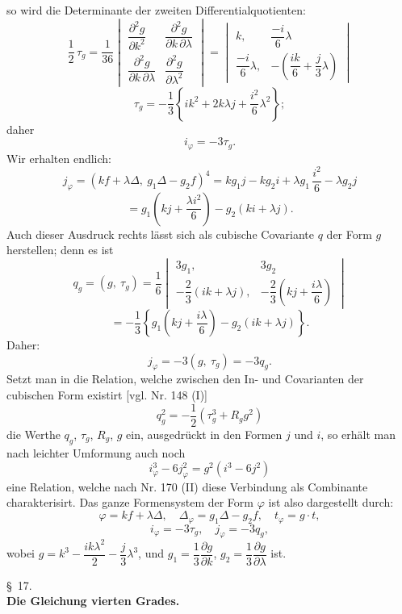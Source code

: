 \documentclass[11pt]{article}
\providecommand{\weberpage}[1]{}
\begin{document}
\weberpage{190}
so wird die Determinante der zweiten Differentialquotienten:
\[
\frac{1}{2}\,\tau_g = \frac{1}{36}
\begin{vmatrix}
\dfrac{\partial^2 g}{\partial k^2} & \dfrac{\partial^2 g}{\partial k\,\partial \lambda} \\
\dfrac{\partial^2 g}{\partial k\,\partial \lambda} & \dfrac{\partial^2 g}{\partial \lambda^2}
\end{vmatrix}
=
\begin{vmatrix}
k, & \dfrac{-i}{6}\lambda \\
\dfrac{-i}{6}\lambda, & -\left(\dfrac{ik}{6}+\dfrac{j}{3}\lambda\right)
\end{vmatrix}
\]
\[
\tau_g = -\frac{1}{3}\left\{ i k^2 + 2k\lambda j + \frac{i^2}{6}\lambda^2 \right\};
\]
daher
\[
i_\varphi = -3\tau_g .
\]
Wir erhalten endlich:
\[
j_\varphi = (kf+\lambda\varDelta,\ g_1\varDelta - g_2 f)^4 = k g_1 j - k g_2 i + \lambda g_1\,\frac{i^2}{6} - \lambda g_2 j
\]
\[
= g_1\left(kj + \frac{\lambda i^2}{6}\right) - g_2(ki+\lambda j).
\]
Auch dieser Ausdruck rechts lässt sich als cubische Covariante $q$ der
Form $g$ herstellen; denn es ist
\[
q_g = (g,\ \tau_g) = \frac{1}{6}
\begin{vmatrix}
3g_1, & 3g_2 \\
-\dfrac{2}{3}(ik+\lambda j), & -\dfrac{2}{3}\left(kj+\dfrac{i\lambda}{6}\right)
\end{vmatrix}
\]
\[
= -\frac{1}{3}\left\{ g_1\left(kj+\frac{i\lambda}{6}\right) - g_2(ik+\lambda j) \right\}.
\]
Daher:
\[
j_\varphi = -3(g,\ \tau_g) = -3 q_g .
\]
Setzt man in die Relation, welche zwischen den In- und Covarianten
 der cubischen Form existirt [vgl. Nr. 148 (I)]
\[
q_g^2 = -\frac{1}{2}(\tau_g^3 + R_g g^2)
\]
die Werthe $q_g$, $\tau_g$, $R_g$, $g$ ein, ausgedrückt in den Formen $j$ und $i$,
so erhält man nach leichter Umformung auch noch
\[
i_\varphi^3 - 6 j_\varphi^2 = g^2(i^3 - 6j^2)
\]
eine Relation, welche nach Nr. 170 (II) diese Verbindung als Combinante
 charakterisirt. Das ganze Formensystem der Form $\varphi$ ist also
dargestellt durch:
\[
\varphi = kf+\lambda\varDelta, \quad \varDelta_\varphi = g_1\varDelta - g_2 f, \quad t_\varphi = g\cdot t,
\]
\[
i_\varphi = -3\tau_g, \quad j_\varphi = -3q_g,
\]
wobei $g = k^3 - \dfrac{ik\lambda^2}{2} - \dfrac{j}{3}\lambda^3$, und $g_1 = \dfrac{1}{3}\dfrac{\partial g}{\partial k}$, $g_2 = \dfrac{1}{3}\dfrac{\partial g}{\partial \lambda}$ ist.


\weberpage{191}
\begin{center}
\S~17.\\[2pt]
\textbf{Die Gleichung vierten Grades.}
\end{center}
\end{document}
